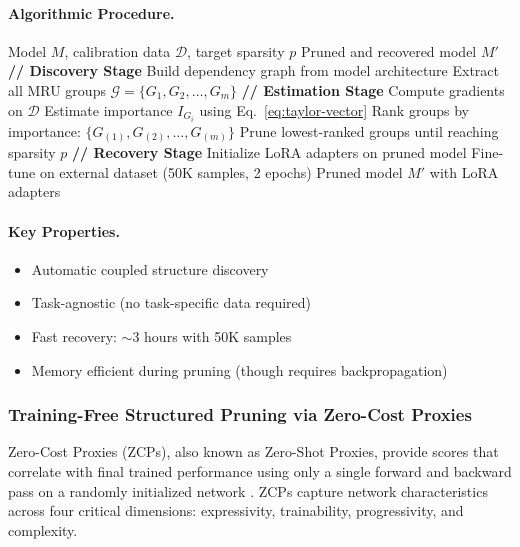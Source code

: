 \paragraph{Algorithmic Procedure.}
\begin{algorithm}[H]
	\caption{LLM-Pruner}
	\begin{algorithmic}[1]
		\Require Model $M$, calibration data $\mathcal{D}$, target sparsity $p$
		\Ensure Pruned and recovered model $M'$
		\State \textbf{// Discovery Stage}
		\State Build dependency graph from model architecture
		\State Extract all MRU groups $\mathcal{G} = \{G_1, G_2, \ldots, G_m\}$
		\State \textbf{// Estimation Stage}
		\State Compute gradients on $\mathcal{D}$
		\State Estimate importance $I_{G_i}$ using Eq.~\eqref{eq:taylor-vector}
		\EndFor
		\State Rank groups by importance: $\{G_{(1)}, G_{(2)}, \ldots, G_{(m)}\}$
		\State Prune lowest-ranked groups until reaching sparsity $p$
		\State \textbf{// Recovery Stage}
		\State Initialize LoRA adapters on pruned model
		\State Fine-tune on external dataset (50K samples, 2 epochs)
		\State \Return Pruned model $M'$ with LoRA adapters
	\end{algorithmic}
\end{algorithm}

\paragraph{Key Properties.}
\begin{itemize}[nosep]
	\item Automatic coupled structure discovery
	\item Task-agnostic (no task-specific data required)
	\item Fast recovery: $\sim$3 hours with 50K samples
	\item Memory efficient during pruning (though requires backpropagation)
\end{itemize}

\subsubsection{Training-Free Structured Pruning via Zero-Cost Proxies}

Zero-Cost Proxies (ZCPs), also known as Zero-Shot Proxies, provide scores that correlate with final trained performance using only a single forward and backward pass on a randomly initialized network \cite{abdelfattah2021zero,li2023zeroshot}. ZCPs capture network characteristics across four critical dimensions: expressivity, trainability, progressivity, and complexity.

